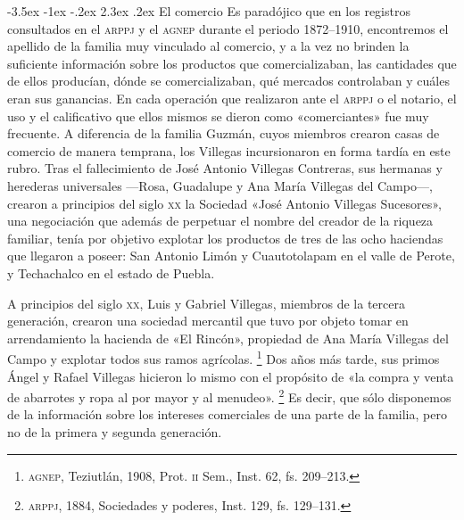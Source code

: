 \documentclass[14pt,twoside,final]{extbook} %
\makeatletter
\let\oldfootnote\footnote
\renewcommand\footnote[1]{%
\oldfootnote{\hspace{1mm}#1}}
\renewcommand\section{\@startsection {section}{1}{\z@}%
                                     {-3.5ex \@plus -1ex \@minus -.2ex}%
                                     {2.3ex \@plus .2ex}%
                                     {\normalfont\large\bfseries\sc}}
\makeatother
\begin{document}
\section{El comercio}
\label{sec:el-comercio}
Es paradójico que en los registros consultados en el \textsc{arppj} y el \textsc{agnep} durante el periodo 1872--1910, encontremos el apellido de la familia muy vinculado al comercio, y a la vez no brinden la suficiente información sobre los productos que comercializaban, las cantidades que de ellos producían, dónde se comercializaban, qué mercados controlaban y cuáles eran sus ganancias. En cada operación que realizaron ante el \textsc{arppj} o el notario, el uso y el calificativo que ellos mismos se dieron como «comerciantes» fue muy frecuente. A diferencia de la familia Guzmán, cuyos miembros crearon casas de comercio de manera temprana, los Villegas incursionaron en forma tardía en este rubro. Tras el fallecimiento de José Antonio Villegas Contreras, sus hermanas y herederas universales ---Rosa, Guadalupe y Ana María Villegas del Campo---, crearon a principios del siglo \textsc{xx} la Sociedad «José Antonio Villegas Sucesores», una negociación que además de perpetuar el nombre del creador de la riqueza familiar, tenía por objetivo explotar los productos de tres de las ocho haciendas que llegaron a poseer: San Antonio Limón y Cuautotolapam en el valle de Perote, y Techachalco en el estado de Puebla.

A principios del siglo \textsc{xx}, Luis y Gabriel Villegas, miembros de la tercera generación, crearon una sociedad mercantil que tuvo por objeto tomar en arrendamiento la hacienda de «El Rincón», propiedad de Ana María Villegas del Campo y explotar todos sus ramos agrícolas.\footnote{\textsc{agnep}, Teziutlán, 1908, Prot. \textsc{ii} Sem., Inst. 62, fs. 209--213.} Dos años más tarde, sus primos Ángel y Rafael Villegas hicieron lo mismo con el propósito de «la compra y venta de abarrotes y ropa al por mayor y al menudeo».\footnote{\textsc{arppj}, 1884, Sociedades y poderes, Inst. 129, fs. 129--131.} Es decir, que sólo disponemos de la información sobre los intereses comerciales de una parte de la familia, pero no de la primera y segunda generación.
\end{document}
